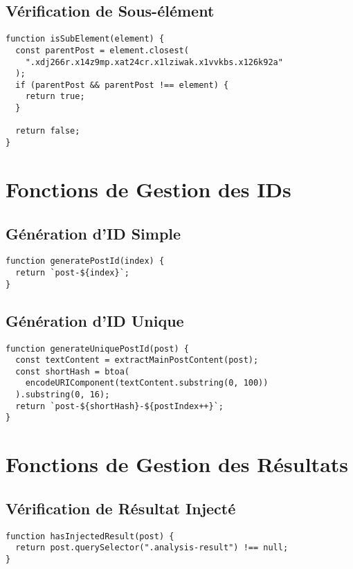 \documentclass[12pt,a4paper]{article}
\begin{document}
\subsection{Vérification de Sous-élément}

\begin{lstlisting}
function isSubElement(element) {
  const parentPost = element.closest(
    ".xdj266r.x14z9mp.xat24cr.x1lziwak.x1vvkbs.x126k92a"
  );
  if (parentPost && parentPost !== element) {
    return true;
  }

  return false;
}
\end{lstlisting}

\section{Fonctions de Gestion des IDs}

\subsection{Génération d'ID Simple}

\begin{lstlisting}
function generatePostId(index) {
  return `post-${index}`;
}
\end{lstlisting}

\subsection{Génération d'ID Unique}

\begin{lstlisting}
function generateUniquePostId(post) {
  const textContent = extractMainPostContent(post);
  const shortHash = btoa(
    encodeURIComponent(textContent.substring(0, 100))
  ).substring(0, 16);
  return `post-${shortHash}-${postIndex++}`;
}
\end{lstlisting}

\section{Fonctions de Gestion des Résultats}

\subsection{Vérification de Résultat Injecté}

\begin{lstlisting}
function hasInjectedResult(post) {
  return post.querySelector(".analysis-result") !== null;
}
\end{lstlisting}
\end{document}
